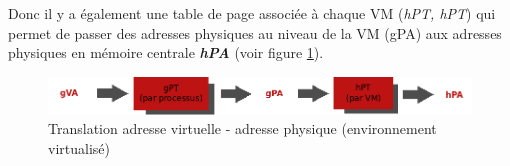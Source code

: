 Donc il y a également une table de page associée à chaque VM (\textit{\acl{hPT}, \acs{hPT}}) qui permet de passer des adresses physiques au niveau de la VM (\acs{gPA}) aux adresses physiques en mémoire centrale \textit{\textbf{\ac{hPA}}} (voir figure \ref{fig:vaddr_paddr_virt}).
\begin{figure}[htp]
    \centering
    \includegraphics[scale=.5]{chapters/1/fig1/vaddr_paddr_virt}
    \caption{Translation adresse virtuelle - adresse physique (environnement virtualisé)}
    \label{fig:vaddr_paddr_virt}
\end{figure}